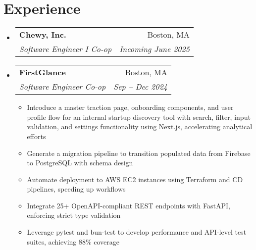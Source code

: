 \documentclass[letterpaper,11pt]{article}
\makeatletter
\newcommand{\resumeItem}[1]{
  \item\small{
    {#1 \vspace{-2pt}}
  }
}
\newcommand{\resumeSubheading}[4]{
  \vspace{-10pt}\item
    \begin{tabular*}{1.0\textwidth}[t]{l@{\extracolsep{\fill}}r}
      \textbf{#1} & \small #2 \\
      \textit{\small#3} & \textit{\small #4} \\
    \end{tabular*}\vspace{-5pt}
}
\newcommand{\resumeSubHeadingListStart}{\begin{itemize}[leftmargin=0.0in, label={}]}
\newcommand{\resumeSubHeadingListEnd}{\end{itemize}}
\newcommand{\resumeItemListStart}{\begin{itemize}}
\newcommand{\resumeItemListEnd}{\end{itemize}}
\makeatother
\begin{document}
\section{Experience}
    \resumeSubHeadingListStart
        \resumeSubheading
        {Chewy, Inc.}{Boston, MA}
        {Software Engineer I Co-op}{Incoming June 2025}
        \vspace{6pt}
        \resumeSubheading
        {FirstGlance}{Boston, MA}
        {Software Engineer Co-op}{Sep – Dec 2024}
        \resumeItemListStart
            \resumeItem{Introduce a master traction page, onboarding components, and user profile flow for an internal startup discovery tool with search, filter, input validation, and settings functionality using Next.js, accelerating analytical efforts}
            \resumeItem{Generate a migration pipeline to transition populated data from Firebase to PostgreSQL with schema design}
            \resumeItem{Automate deployment to AWS EC2 instances using Terraform and CD pipelines, speeding up workflows}
            \resumeItem{Integrate 25+ OpenAPI-compliant REST endpoints with FastAPI, enforcing strict type validation}
            \resumeItem{Leverage pytest and bun-test to develop performance and API-level test suites, achieving 88\% coverage}
        \resumeItemListEnd
  \resumeSubHeadingListEnd
\vspace{-14pt}

\end{document}

